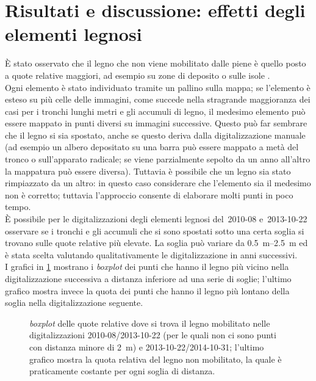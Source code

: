 \section{Risultati e discussione: effetti degli elementi legnosi}
È stato osservato che il legno che non viene mobilitato dalle piene è quello posto a quote relative maggiori, ad esempio su zone di deposito o sulle isole .
\\
Ogni elemento è stato individuato tramite un pallino sulla mappa; se l'elemento è esteso su più celle delle immagini, come succede nella stragrande maggioranza dei casi per i tronchi lunghi metri e gli accumuli di legno, il medesimo elemento può essere mappato in punti diversi su immagini successive.
Questo può far sembrare che il legno si sia spostato, anche se questo deriva dalla digitalizzazione manuale (ad esempio un albero depositato su una barra può essere mappato a metà del tronco o sull'apparato radicale; se viene parzialmente sepolto da un anno all'altro la mappatura può essere diversa).
Tuttavia è possibile che un legno sia stato rimpiazzato da un altro: in questo caso considerare che l'elemento sia il medesimo non è corretto; tuttavia l'approccio consente di elaborare molti punti in poco tempo.
\\
È possibile per le digitalizzazioni degli elementi legnosi del~2010-08 e~2013-10-22 osservare se i tronchi e gli accumuli che si sono spostati sotto una certa soglia si trovano sulle quote relative più elevate.
La soglia può variare da \SIrange[range-phrase = { a }]{0.5}{2.5}{\m} ed è stata scelta valutando qualitativamente le digitalizzazione in anni successivi.
\\
I grafici in \cref{graph:legno-dem-detrended-distanza} mostrano i \emph{boxplot} dei punti che hanno il legno più vicino nella digitalizzazione successiva a distanza inferiore ad una serie di soglie; l'ultimo grafico mostra invece la quota dei punti che hanno il legno più lontano della soglia nella digitalizzazione seguente.
%
\begin{figure}
	\centering
	
	\caption[\emph{boxplot} delle quote relative dove si trova il legno mobilitato]{\emph{boxplot} delle quote relative dove si trova il legno mobilitato nelle digitalizzazioni 2010-08/2013-10-22 (per le quali non ci sono punti con distanza minore di \SI{2}{\m}) e 2013-10-22/2014-10-31; l'ultimo grafico mostra la quota relativa del legno non mobilitato, la quale è praticamente costante per ogni soglia di distanza.}
	\label{graph:legno-dem-detrended-distanza}
\end{figure}
%

